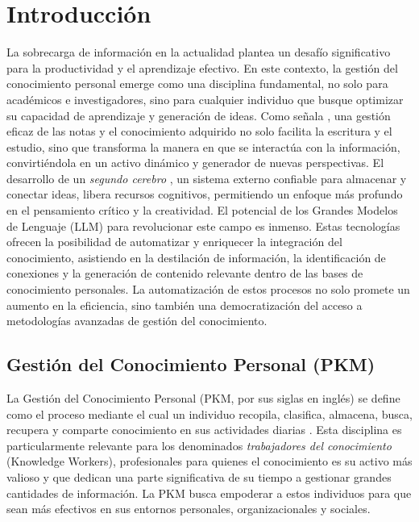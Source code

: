 \chapter{Introducción}
\label{chapter:introduccion}

La sobrecarga de información en la actualidad plantea un desafío significativo para la productividad y el aprendizaje efectivo. En este contexto, la gestión del conocimiento personal emerge como una disciplina fundamental, no solo para académicos e investigadores, sino para cualquier individuo que busque optimizar su capacidad de aprendizaje y generación de ideas. Como señala \cite{ahrensHowTakeSmart2017}, una gestión eficaz de las notas y el conocimiento adquirido no solo facilita la escritura y el estudio, sino que transforma la manera en que se interactúa con la información, convirtiéndola en un activo dinámico y generador de nuevas perspectivas. El desarrollo de un \textit{segundo cerebro} \parencite{forteBuildingSecondBrain2022}, un sistema externo confiable para almacenar y conectar ideas, libera recursos cognitivos, permitiendo un enfoque más profundo en el pensamiento crítico y la creatividad.
El potencial de los Grandes Modelos de Lenguaje (LLM) para revolucionar este campo es inmenso. Estas tecnologías ofrecen la posibilidad de automatizar y enriquecer la integración del conocimiento, asistiendo en la destilación de información, la identificación de conexiones y la generación de contenido relevante dentro de las bases de conocimiento personales. La automatización de estos procesos no solo promete un aumento en la eficiencia, sino también una democratización del acceso a metodologías avanzadas de gestión del conocimiento.

\section{Gestión del Conocimiento Personal (PKM)}
\label{sec:pkm}
La Gestión del Conocimiento Personal (PKM, por sus siglas en inglés) se define como el proceso mediante el cual un individuo recopila, clasifica, almacena, busca, recupera y comparte conocimiento en sus actividades diarias \parencite{grundspenkisAgentBasedApproach2007}. Esta disciplina es particularmente relevante para los denominados \textit{trabajadores del conocimiento} (Knowledge Workers), profesionales para quienes el conocimiento es su activo más valioso y que dedican una parte significativa de su tiempo a gestionar grandes cantidades de información. La PKM busca empoderar a estos individuos para que sean más efectivos en sus entornos personales, organizacionales y sociales.

